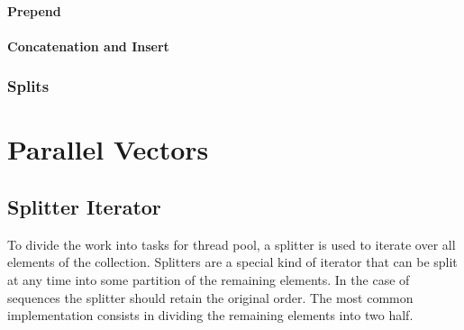 \paragraph{Prepend}

\paragraph{Concatenation and Insert}



\subsubsection{Splits}



\section{Parallel Vectors}


\subsection{Splitter Iterator}
To divide the work into tasks for thread pool, a splitter is used to iterate over all elements of the collection. Splitters are a special kind of iterator that can be split at any time into some partition of the remaining elements. In the case of sequences the splitter should retain the original order. The most common implementation consists in dividing the remaining elements into two half. 


